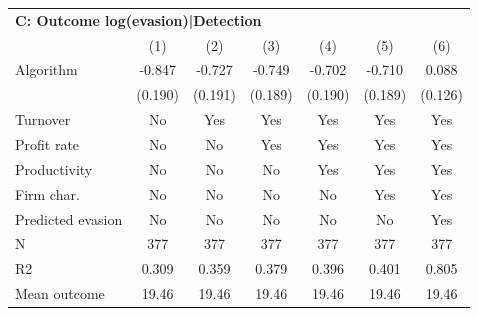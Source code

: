 \begin{tabular}{lcccccc}
\midrule \multicolumn{7}{l}{\textbf{C: Outcome log(evasion)|Detection}} \\ \multicolumn{1}{l}{} & (1) & (2) & (3) & (4) & (5) & (6) \\ \midrule
Algorithm   &      -0.847\sym{***}&      -0.727\sym{***}&      -0.749\sym{***}&      -0.702\sym{***}&      -0.710\sym{***}&       0.088         \\
            &     (0.190)         &     (0.191)         &     (0.189)         &     (0.190)         &     (0.189)         &     (0.126)         \\
\midrule
Turnover    &          No         &         Yes         &         Yes         &         Yes         &         Yes         &         Yes         \\
Profit rate &          No         &          No         &         Yes         &         Yes         &         Yes         &         Yes         \\
Productivity&          No         &          No         &          No         &         Yes         &         Yes         &         Yes         \\
Firm char.  &          No         &          No         &          No         &          No         &         Yes         &         Yes         \\
Predicted evasion&          No         &          No         &          No         &          No         &          No         &         Yes         \\
N           &         377         &         377         &         377         &         377         &         377         &         377         \\
R2          &       0.309         &       0.359         &       0.379         &       0.396         &       0.401         &       0.805         \\
Mean outcome&       19.46         &       19.46         &       19.46         &       19.46         &       19.46         &       19.46         \\
\bottomrule \end{tabular}
